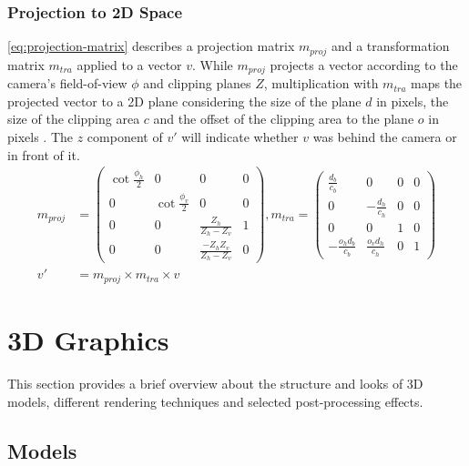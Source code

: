 \subsubsection{Projection to 2D Space}
\ref{eq:projection-matrix} describes a projection matrix $m_{proj}$ and a transformation matrix $m_{tra}$ applied to a vector $v$. While $m_{proj}$ projects a vector according to the camera's field-of-view $\phi$ and clipping planes $Z$, multiplication with $m_{tra}$ maps the projected vector to a 2D plane considering the size of the plane $d$ in pixels, the size of the clipping area $c$ and the offset of the clipping area to the plane $o$ in pixels \cite{Seufert2009}. The $z$ component of $v'$ will indicate whether $v$ was behind the camera or in front of it.
\begin{equation}
    \begin{split}
    m_{proj} & = \begin{pmatrix}
        \cot{\frac{\phi_h}{2}} & 0 & 0 & 0\\
        0 & \cot{\frac{\phi_v}{2}} & 0 & 0\\
        0 & 0 & \frac{Z_h}{Z_h-Z_v} & 1\\
        0 & 0 & \frac{-Z_h Z_v}{Z_h-Z_v} & 0
    \end{pmatrix}, 
    m_{tra} = \begin{pmatrix}
        \frac{d_b}{c_b} & 0 & 0 & 0\\
        0 & -\frac{d_h}{c_h} & 0 & 0\\
        0 & 0 & 1 & 0\\
        -\frac{o_hd_b}{c_b} & \frac{o_v d_h}{c_h} & 0 & 1
    \end{pmatrix}\\
    v' & = m_{proj} \times m_{tra} \times v
    \end{split}
    \label{eq:projection-matrix}
\end{equation}
\clearpage

\section{3D Graphics}
This section provides a brief overview about the structure and looks of 3D models, different rendering techniques and selected post-processing effects.
\subsection{Models}
